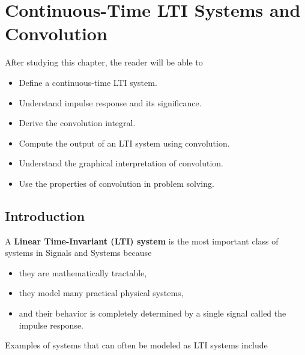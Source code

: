 
\chapter{Continuous-Time LTI Systems and Convolution}

\begin{tcolorbox}[colback=blue!5!white,colframe=blue!70!black,title=Learning Objectives]

After studying this chapter, the reader will be able to

\begin{itemize}
\item Define a continuous-time LTI system.
\item Understand impulse response and its significance.
\item Derive the convolution integral.
\item Compute the output of an LTI system using convolution.
\item Understand the graphical interpretation of convolution.
\item Use the properties of convolution in problem solving.
\end{itemize}

\end{tcolorbox}


\section{Introduction}

A \textbf{Linear Time-Invariant (LTI) system} is the most important class of
systems in Signals and Systems because

\begin{itemize}
\item they are mathematically tractable,
\item they model many practical physical systems,
\item and their behavior is completely determined by a single signal called the
impulse response.
\end{itemize}

Examples of systems that can often be modeled as LTI systems include

